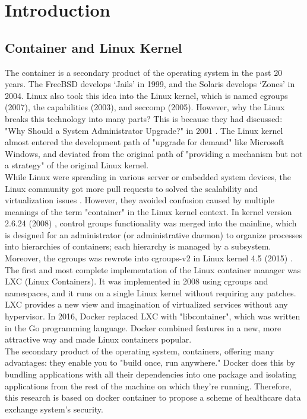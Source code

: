 \chapter{Introduction}

\section{Container and Linux Kernel}

The container is a secondary product of the operating system in the past 20 years.
The FreeBSD develops `Jails' in 1999, and the Solaris develops `Zones' in 2004.
Linux also took this idea into the Linux kernel, which is named cgroups (2007),
the capabilities (2003), and seccomp (2005). However, why the Linux breaks this
technology into many parts? This is because they had discussed:
"Why Should a System Administrator Upgrade?" in 2001 \cite{20667}.
The Linux kernel almost entered the development path of "upgrade for demand" like
Microsoft Windows, and deviated from the original path of "providing a mechanism
but not a strategy" of the original Linux kernel. \\

While Linux were spreading in various server or embedded system devices, the
Linux community got more pull requests to solved the scalability and virtualization
issues \cite{267148}. However, they avoided confusion caused by multiple meanings of
the term "container" in the Linux kernel context. In kernel version 2.6.24 (2008)
\cite{256389}, control groups functionality was merged into the mainline,
which is designed for an administrator (or administrative daemon) to organize processes
into hierarchies of containers; each hierarchy is managed by a subsystem. Moreover, the
cgroups was rewrote into cgroups-v2 in Linux kernel 4.5 (2015) \cite{cgroup-v2}.\\

The first and most complete implementation of the Linux container manager was LXC
(Linux Containers). It was implemented in 2008 using cgroups and namespaces,
and it runs on a single Linux kernel without requiring any patches. LXC provides
a new view and imagination of virtualized services without any hypervisor. In 2016,
Docker replaced LXC with "libcontainer", which was written in the Go programming language.
Docker combined features in a new, more attractive way and made Linux containers popular.\\

The secondary product of the operating system, containers, offering many advantages:
they enable you to "build once, run anywhere." Docker does this by bundling
applications with all their dependencies into one package and isolating applications
from the rest of the machine on which they're running. Therefore, this research
is based on docker container to propose a scheme of healthcare data exchange system's
security.

